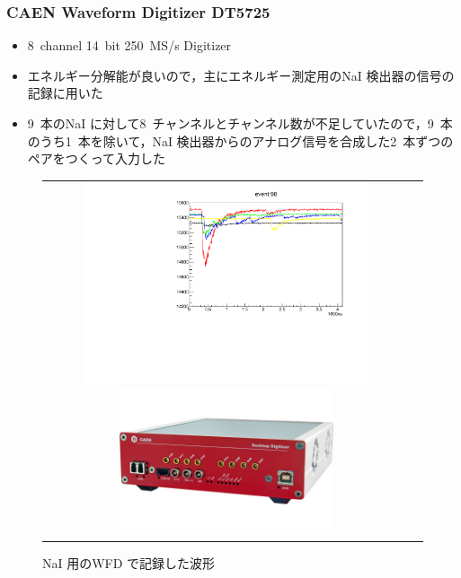 \subsubsection{CAEN Waveform Digitizer DT5725}
\begin{itemize}
\item 8~channel 14~bit 250~MS/s Digitizer
\item エネルギー分解能が良いので，主にエネルギー測定用のNaI 検出器の信号の記録に用いた
\item 9~本のNaI に対して8~チャンネルとチャンネル数が不足していたので，9~本のうち1~本を除いて，NaI 検出器からのアナログ信号を合成した2~本ずつのペアをつくって入力した
\end{itemize}
\begin{figure}[H]
\begin{tabular}{cc}
\begin{minipage}{0.5\hsize}
\centering
\includegraphics[width=0.8\textwidth,angle=-90]{figure/hayakawa/NaI_plot.pdf}
\caption{NaI 用のWFD で記録した波形}
\end{minipage}
\begin{minipage}{0.4\hsize}
\centering
\includegraphics[width=0.6\textwidth]{figure/hayakawa/DT5725_L.png}
\end{minipage}
\end{tabular}
\end{figure}


%
